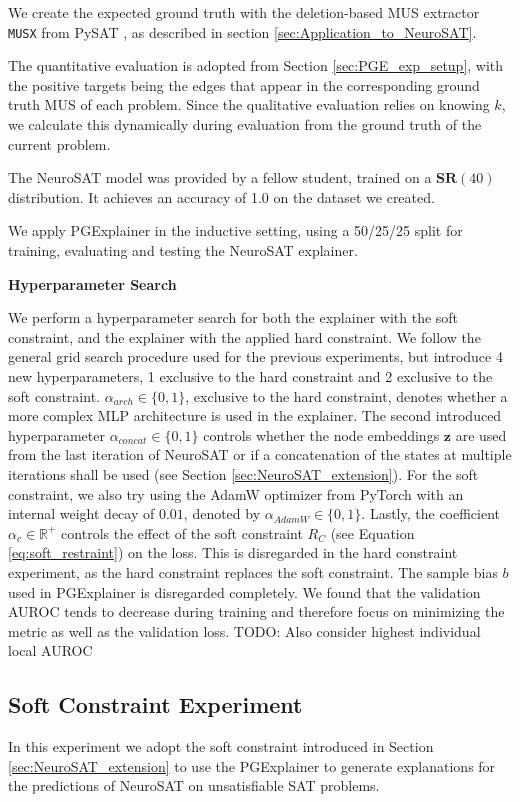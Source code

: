 We create the expected ground truth with the deletion-based MUS extractor \lstinline|MUSX| from PySAT \cite{imms-sat18}, as described in section \ref{sec:Application_to_NeuroSAT}.

The quantitative evaluation is adopted from Section \ref{sec:PGE_exp_setup}, with the positive targets being the edges that appear in the corresponding ground truth MUS of each problem. Since the qualitative evaluation relies on knowing $k$, we calculate this dynamically during evaluation from the ground truth of the current problem.

The NeuroSAT model was provided by a fellow student, trained on a $\textbf{SR}(40)$ distribution. It achieves an accuracy of 1.0 on the dataset we created.

We apply PGExplainer in the inductive setting, using a 50/25/25 split for training, evaluating and testing the NeuroSAT explainer. \bigskip

\textbf{Hyperparameter Search}\par
We perform a hyperparameter search for both the explainer with the soft constraint, and the explainer with the applied hard constraint. We follow the general grid search procedure used for the previous experiments, but introduce 4 new hyperparameters, 1 exclusive to the hard constraint and 2 exclusive to the soft constraint. $\alpha_{arch} \in \{0,1\}$, exclusive to the hard constraint, denotes whether a more complex MLP architecture is used in the explainer. The second introduced hyperparameter $\alpha_{concat} \in \{0,1\}$ controls whether the node embeddings $\mathbf{z}$ are used from the last iteration of NeuroSAT or if a concatenation of the states at multiple iterations shall be used (see Section \ref{sec:NeuroSAT_extension}). For the soft constraint, we also try using the AdamW \cite{loshchilov2017decoupled} optimizer from PyTorch with an internal weight decay of $0.01$, denoted by $\alpha_{AdamW} \in \{0,1\}$. Lastly, the coefficient $\alpha_{c} \in \mathbb{R}^+$ controls the effect of the soft constraint $R_C$ (see Equation \ref{eq:soft_restraint}) on the loss. This is disregarded in the hard constraint experiment, as the hard constraint replaces the soft constraint. The sample bias $b$ used in PGExplainer is disregarded completely. We found that the validation AUROC tends to decrease during training and therefore focus on minimizing the metric as well as the validation loss. TODO: Also consider highest individual local AUROC


\subsection{Soft Constraint Experiment}
In this experiment we adopt the soft constraint introduced in Section \ref{sec:NeuroSAT_extension} to use the PGExplainer to generate explanations for the predictions of NeuroSAT on unsatisfiable SAT problems. \bigskip

